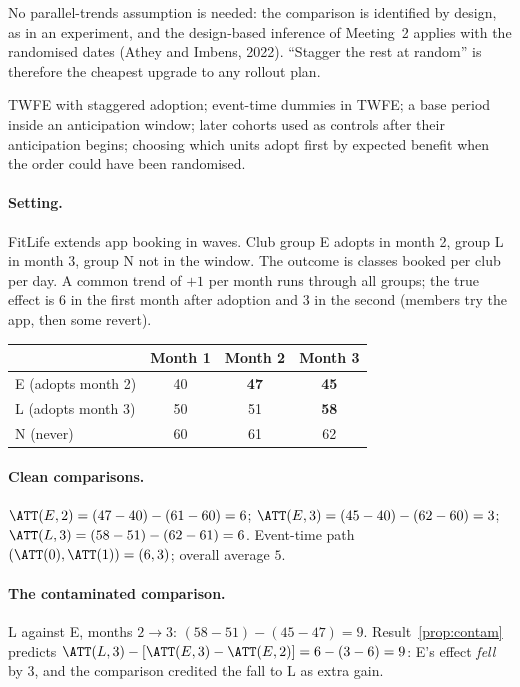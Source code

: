 \documentclass[11pt]{article}
\begin{document}
No parallel-trends assumption is needed: the comparison is identified by design, as in an experiment, and the design-based inference of Meeting~2
applies with the randomised dates (Athey and Imbens, 2022). ``Stagger the rest at random'' is therefore the cheapest upgrade to any rollout plan.

\begin{pitfall}
TWFE with staggered adoption; event-time dummies in TWFE; a base period inside an anticipation window; later cohorts used as controls after their
anticipation begins; choosing which units adopt first by expected benefit when the order could have been randomised.
\end{pitfall}

\sectiontwo

\paragraph{Setting.} FitLife extends app booking in waves. Club group E adopts in month 2, group L in month 3, group N not in the window. The outcome is
classes booked per club per day. A common trend of $+1$ per month runs through all groups; the true effect is $6$ in the first month after adoption and
$3$ in the second (members try the app, then some revert).
\begin{center}
\begin{tabular}{lccc}
\toprule
& Month 1 & Month 2 & Month 3 \\
\midrule
E (adopts month 2) & 40 & \textbf{47} & \textbf{45} \\
L (adopts month 3) & 50 & 51 & \textbf{58} \\
N (never) & 60 & 61 & 62 \\
\bottomrule
\end{tabular}
\end{center}

\paragraph{Clean comparisons.} $\ATT(E,2) = (47 - 40) - (61 - 60) = 6$; $\ATT(E,3) = (45 - 40) - (62 - 60) = 3$; $\ATT(L,3) = (58 - 51) - (62 - 61) = 6$. Event-time path
$(\ATT(0), \ATT(1)) = (6, 3)$; overall average $5$.

\paragraph{The contaminated comparison.} L against E, months $2 \to 3$: $(58 - 51) - (45 - 47) = 9$. Result~\ref{prop:contam} predicts
$\ATT(L,3) - [\ATT(E,3) - \ATT(E,2)] = 6 - (3 - 6) = 9$: E's effect \emph{fell} by $3$, and the comparison credited the fall to L as extra gain.
\end{document}
